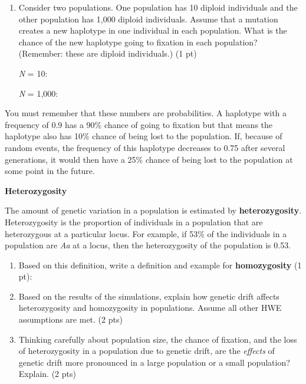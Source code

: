 \documentclass[11pt]{article}
\begin{document}
\begin{enumerate}[resume]

\item Consider two populations. One population has 10 diploid
individuals and the other population has 1,000 diploid individuals.
Assume that a mutation creates a new haplotype in one individual in each
population. What is the chance of the new haplotype going to fixation in
each population? (Remember: these are diploid individuals.) (1 pt)\bigskip

\emph{N} = 10:\bigskip

\emph{N} = 1,000:\bigskip

\end{enumerate}

You must remember that these numbers are probabilities. A haplotype with
a frequency of 0.9 has a 90\% chance of going to fixation but that means
the haplotype also has 10\% chance of being lost to the population. If,
because of random events, the frequency of this haplotype decreases to
0.75 after several generations, it would then have a 25\% chance of
being lost to the population at some point in the future.\bigskip

\textbf{Heterozygosity}\bigskip

The amount of genetic variation in a population is estimated by
\textbf{heterozygosity}. Heterozygosity is the proportion of individuals
in a population that are heterozygous at a particular locus. For
example, if 53\% of the individuals in a population are \emph{Aa} at a
locus, then the heterozygosity of the population is 0.53.

\begin{enumerate}[resume]
\item Based on this definition, write a definition and example
for \textbf{homozygosity} (1 pt):\newpage

\item Based on the results of the simulations, explain how
genetic drift affects heterozygosity and homozygosity in populations.
Assume all other HWE assumptions are met. (2 pts)\vspace {6cm}

\item Thinking carefully about population size, the chance of
fixation, and the loss of heterozygosity in a population due to genetic
drift, are the \emph{effects} of genetic drift more pronounced in a
large population or a small population? Explain. (2 pts)\vspace{5cm}
\end{enumerate}
\end{document}
